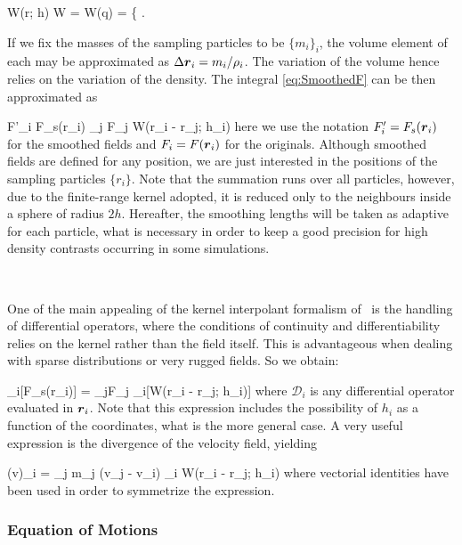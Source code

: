 \documentclass[a4,useAMS,usenatbib,usegraphicx,12pt]{article}
\begin{document}
{ W(r; h) \equiv W = W(q) = 
\left\{  \right. }

If we fix the masses of the sampling particles to be $\{m_i\}_i$, the volume
element of each may be approximated as $\Delta \boldsymbol{ r }_i = m_i/\rho_i$. The 
variation of the volume hence relies on the variation of the density. The 
integral \ref{eq:SmoothedF} can be then approximated as

{ F'_i \equiv F_s(\bds r_i) \approx \sum_j F_j 
W(\bds r_i - \bds r_j; h_i) }
here we use the notation $F'_i = F_s(\boldsymbol{ r }_i)$ for the smoothed fields and
$F_i = F(\boldsymbol{ r }_i)$ for the originals. Although smoothed fields are defined 
for any position, we are just interested in the positions of the sampling 
particles $\{r_i\}$. Note that the summation runs over all particles, however, 
due to the finite-range kernel adopted, it is reduced only to the neighbours 
inside a sphere of radius $2h$. Hereafter, the smoothing lengths will be taken 
as adaptive for each particle, what is necessary in order to keep a good 
precision for high density contrasts occurring in some simulations.

\

One of the main appealing of the kernel interpolant formalism of \SPH\ is the
handling of differential operators, where the conditions of continuity and 
differentiability relies on the kernel rather than the field itself. This is 
advantageous when dealing with sparse distributions or very rugged fields. So
we obtain:

{ _i[F_s(\bds r_i)] = \sum_jF_j 
_i[W(\bds r_i - \bds r_j; h_i)] }
where $\mathcal{D}_i$ is any differential operator evaluated in $\boldsymbol{ r }_i$. Note
that this expression includes the possibility of $h_i$ as a function of the 
coordinates, what is the more general case. A very useful expression is the 
divergence of the velocity field, yielding

{ (\nabla \cdot \bds v)_i = \sum_j m_j (\bds v_j - \bds v_i)
\cdot \nabla_i W(\bds r_i - \bds r_j; h_i) }
where vectorial identities have been used in order to symmetrize the expression.

\subsubsection*{Equation of Motions}
\end{document}
